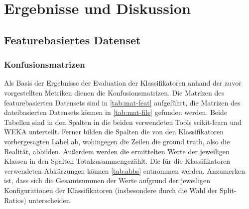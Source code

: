 \section{Ergebnisse und Diskussion}
\label{results}

\subsection{Featurebasiertes Datenset}
\subsubsection*{Konfusionsmatrizen}

Als Basis der Ergebnisse der Evaluation der Klassifikatoren anhand der zuvor vorgestellten Metriken dienen die Konfusionsmatrizen. Die Matrizen des featurebasierten Datensets sind in \autoref{tab:mat-feat} aufgeführt, die Matrizen des dateibasierten Datensets können in \autoref{tab:mat-file} gefunden werden. Beide Tabellen sind in den Spalten in die beiden verwendeten Tools scikit-learn und WEKA unterteilt. Ferner bilden die Spalten die von den Klassifikatoren vorhergesagten Label ab, wohingegen die Zeilen die \glqq ground truth\grqq, also die Realität, abbilden. Außerdem werden die ermittelten Werte der jeweiligen Klassen in den Spalten \glqq Total\grqq zusammengezählt. Die für die Klassifikatoren verwendeten Abkürzungen können \autoref{tab:abbs} entnommen werden. Anzumerken ist, dass sich die Gesamtsummen der Werte aufgrund der jeweiligen Konfigurationen der Klassifikatoren (insbesondere durch die Wahl der Split-Ratios) unterscheiden.

